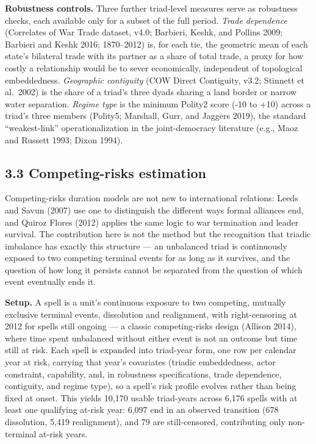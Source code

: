 \documentclass[Afour,sageh,times,doublespace]{sagej}
\begin{document}
\textbf{Robustness controls.} Three further triad-level measures serve as robustness checks, each available only for a subset of the full period. \emph{Trade dependence} (Correlates of War Trade dataset, v4.0; Barbieri, Keshk, and Pollins 2009; Barbieri and Keshk 2016; 1870--2012) is, for each tie, the geometric mean of each state's bilateral trade with its partner as a share of total trade, a proxy for how costly a relationship would be to sever economically, independent of topological embeddedness. \emph{Geographic contiguity} (COW Direct Contiguity, v3.2; Stinnett et al.~2002) is the share of a triad's three dyads sharing a land border or narrow water separation. \emph{Regime type} is the minimum Polity2 score (-10 to +10) across a triad's three members (Polity5; Marshall, Gurr, and Jaggers 2019), the standard ``weakest-link'' operationalization in the joint-democracy literature (e.g., Maoz and Russett 1993; Dixon 1994).

\subsection*{3.3 Competing-risks estimation}

Competing-risks duration models are not new to international relations: Leeds and Savun (2007) use one to distinguish the different ways formal alliances end, and Quiroz Flores (2012) applies the same logic to war termination and leader survival. The contribution here is not the method but the recognition that triadic imbalance has exactly this structure --- an unbalanced triad is continuously exposed to two competing terminal events for as long as it survives, and the question of how long it persists cannot be separated from the question of which event eventually ends it.

\textbf{Setup.} A spell is a unit's continuous exposure to two competing, mutually exclusive terminal events, dissolution and realignment, with right-censoring at 2012 for spells still ongoing --- a classic competing-risks design (Allison 2014), where time spent unbalanced without either event is not an outcome but time still at risk. Each spell is expanded into triad-year form, one row per calendar year at risk, carrying that year's covariates (triadic embeddedness, actor constraint, capability, and, in robustness specifications, trade dependence, contiguity, and regime type), so a spell's risk profile evolves rather than being fixed at onset. This yields 10,170 usable triad-years across 6,176 spells with at least one qualifying at-risk year: 6,097 end in an observed transition (678 dissolution, 5,419 realignment), and 79 are still-censored, contributing only non-terminal at-risk years.
\end{document}
